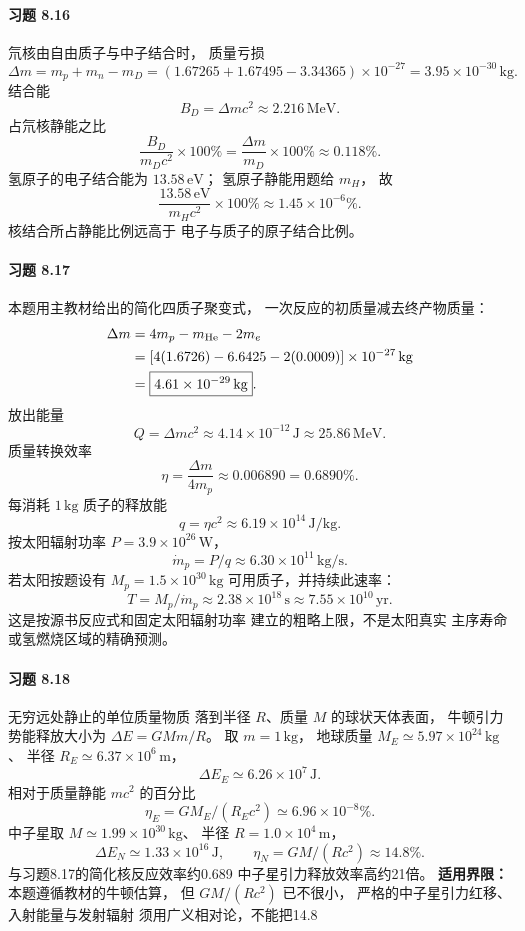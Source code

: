 \paragraph{习题 8.16}
氘核由自由质子与中子结合时，
质量亏损
\[
 \Delta m=m_p+m_n-m_D
 =(1.67265+1.67495-3.34365)\times10^{-27}
 =3.95\times10^{-30}\,\mathrm{kg}.
\]
结合能
\[
 \boxed{B_D=\Delta mc^2
 \approx2.216\,\mathrm{MeV}}.
\]
占氘核静能之比
\[
 \boxed{\frac{B_D}{m_Dc^2}\times100\%
 =\frac{\Delta m}{m_D}\times100\%
 \approx0.118\%}.
\]
氢原子的电子结合能为
\(13.58\,\mathrm{eV}\)；
氢原子静能用题给 \(m_H\)，
故
\[
 \boxed{\frac{13.58\,\mathrm{eV}}
 {m_Hc^2}\times100\%
 \approx1.45\times10^{-6}\%}.
\]
核结合所占静能比例远高于
电子与质子的原子结合比例。

\paragraph{习题 8.17}
本题用主教材给出的简化四质子聚变式，
一次反应的初质量减去终产物质量：
\[
 \begin{aligned}
 \Delta m&=4m_p-m_{\rm He}-2m_e\\
 &=[4(1.6726)-6.6425-2(0.0009)]
 \times10^{-27}\,\mathrm{kg}\\
 &=\boxed{4.61\times10^{-29}\,\mathrm{kg}}.
 \end{aligned}
\]
放出能量
\[
 \boxed{Q=\Delta mc^2\approx
 4.14\times10^{-12}\,\mathrm J
 \approx25.86\,\mathrm{MeV}}.
\]
质量转换效率
\[
 \boxed{\eta=\frac{\Delta m}{4m_p}
 \approx0.006890=0.6890\%}.
\]
每消耗 \(1\,\mathrm{kg}\) 质子的释放能
\[
 \boxed{q=\eta c^2\approx
 6.19\times10^{14}\,\mathrm{J/kg}}.
\]
按太阳辐射功率
\(P=3.9\times10^{26}\,\mathrm W\)，
\[
 \boxed{\dot m_p=P/q
 \approx6.30\times10^{11}\,\mathrm{kg/s}}.
\]
若太阳按题设有
\(M_p=1.5\times10^{30}\,\mathrm{kg}\)
可用质子，并持续此速率：
\[
 \boxed{T=M_p/\dot m_p
 \approx2.38\times10^{18}\,\mathrm s
 \approx7.55\times10^{10}\,\mathrm{yr}}.
\]
这是按源书反应式和固定太阳辐射功率
建立的粗略上限，不是太阳真实
主序寿命或氢燃烧区域的精确预测。

\paragraph{习题 8.18}
无穷远处静止的单位质量物质
落到半径 \(R\)、质量 \(M\) 的球状天体表面，
牛顿引力势能释放大小为
\(\Delta E=GMm/R\)。
取 \(m=1\,\mathrm{kg}\)，
地球质量 \(M_E\simeq5.97\times10^{24}\,\mathrm{kg}\)、
半径 \(R_E\simeq6.37\times10^6\,\mathrm m\)，
\[
 \boxed{\Delta E_E\simeq6.26\times10^7\,\mathrm J}.
\]
相对于质量静能 \(mc^2\)
的百分比
\[
 \boxed{\eta_E=GM_E/(R_Ec^2)
 \simeq6.96\times10^{-8}\%}.
\]
中子星取 \(M\simeq1.99\times10^{30}\,\mathrm{kg}\)、
半径 \(R=1.0\times10^4\,\mathrm m\)，
\[
 \boxed{\Delta E_N\simeq1.33\times10^{16}\,\mathrm J},
\qquad
 \boxed{\eta_N=GM/(Rc^2)\approx14.8\%}.
\]
与习题8.17的简化核反应效率约0.689%
中子星引力释放效率高约21倍。
\textbf{适用界限：}本题遵循教材的牛顿估算，
但 \(GM/(Rc^2)\) 已不很小，
严格的中子星引力红移、入射能量与发射辐射
须用广义相对论，不能把14.8%

